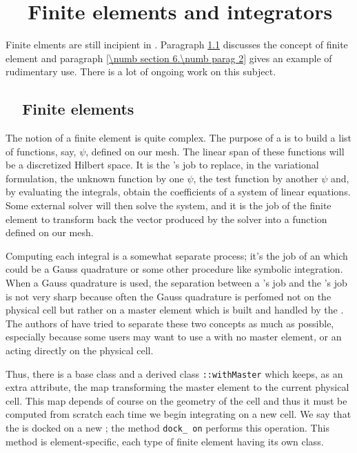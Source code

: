 
\chapter{~~Finite elements and integrators}\label{\numb section 6}


Finite elments are still incipient in \maniFEM.
Paragraph \ref{\numb section 6.\numb parag 1} discusses the concept of finite element
and paragraph \ref{\numb section 6.\numb parag 2} gives an example of rudimentary use.
There is a lot of ongoing work on this subject.


\section{~~Finite elements}\label{\numb section 6.\numb parag 1}

The notion of a finite element is quite complex.
The purpose of a {\small\tt {}} is to build a list of functions, say, $ \psi $,
defined on our mesh.
The linear span of these functions will be a discretized Hilbert space.
It is the {\small\tt {}}'s job to replace, in the variational formulation,
the unknown function by one $ \psi $, the test function by another $ \psi $ and,
by evaluating the integrals, obtain the coefficients of a system of linear equations.
Some external solver will then solve the system, and it is the job of the finite element
to transform back the vector produced by the solver into a function defined on our mesh.

Computing each integral is a somewhat separate process; it's the job of an
{\small\tt {}}
which could be a Gauss quadrature or some other procedure like symbolic integration.
When a Gauss quadrature is used, the separation between a {\small\tt {}}'s job
and the {\small\tt {}}'s job is not very sharp because often the Gauss quadrature is
perfomed not on the physical cell but rather on a master element which is built and
handled by the {\small\tt {}}.
The authors of {\maniFEM} have tried to separate these two concepts
as much as possible, especially because some users may want to use a {\small\tt {}}
with no master element, or an {\small\tt {}} acting directly on the physical cell.

Thus, there is a base class {\small\tt {}} and a derived class
{\small\tt {}::withMaster} which keeps, as an extra attribute, the map transforming
the master element to the current physical cell.
This map depends of course on the geometry of the cell and thus it must be computed from
scratch each time we begin integrating on a new cell.
We say that the {\small\tt {}} is docked on a new {\small\tt {}};
the method {\small\tt dock\_\,on} performs this operation.
This method is element-specific, each type of finite element having its own class.

